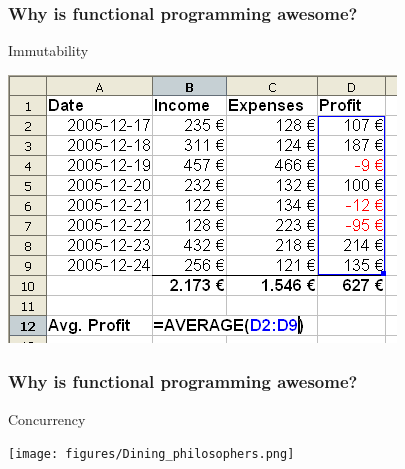 \documentclass[12pt, xcolor=table]{beamer}
\begin{document}

\begin{frame}
    \frametitle{Why is functional programming awesome?}
    \begin{block}{Immutability}
        \begin{center}
            \includegraphics[scale=0.4]{figures/Spreadsheet.png}
        \end{center}
    \end{block}
\end{frame}

\begin{frame}
    \frametitle{Why is functional programming awesome?}
    \begin{block}{Concurrency}
        \begin{center}
            \texttt{[image: figures/Dining\_philosophers.png]}
        \end{center}
    \end{block}
\end{frame}
\end{document}

